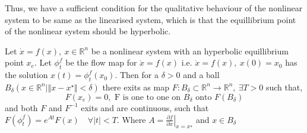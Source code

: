 Thus, we have a sufficient condition for the qualitative behaviour of the nonlinear system to be
same as the linearised system, which is that the equillibrium point of the nonlinear system should
be hyperbolic.

\begin{theorem}
Let \(\dot{x}=f(x),\:x\in\mathbb{R}^n\) be a nonlinear system with an hyperbolic
equillibrium point \(x_e\). Let \(\phi_t^f\) be the flow map for \(\dot{x}=f(x)\) i.e. \(\dot{x}=f(x),\:x(0)=x_0\)
has the solution \(x(t)=\phi_t^f(x_0)\). Then for a \(\delta >0\) and a ball \(B_{\delta}(x\in\mathbb{R}^n \vert
\Vert x-x^{\star}\Vert < \delta)\) there exits as map \(F : B_{\delta} \subset \mathbb{R}^n \to \mathbb{R}^n, \: \exists T > 0\)
such that, 
\[
    F(x_e) = 0, \text{ F is one to one on } B_\delta \text{ onto } F(B_\delta)  
\]        
and both \(F\) and \(F^{-1} \) exits and are continuous, such that \(F(\phi_t^f) = e^{At}F(x) \quad \forall \vert t \vert
< T\). Where \(A = \left . \frac{\partial f}{\partial x} \right |_{x=x^{\star}}\) and \(x\in B_\delta \)\\

\label{thm:hartmanGrobman}
\end{theorem}
\vspace{0.5em}

